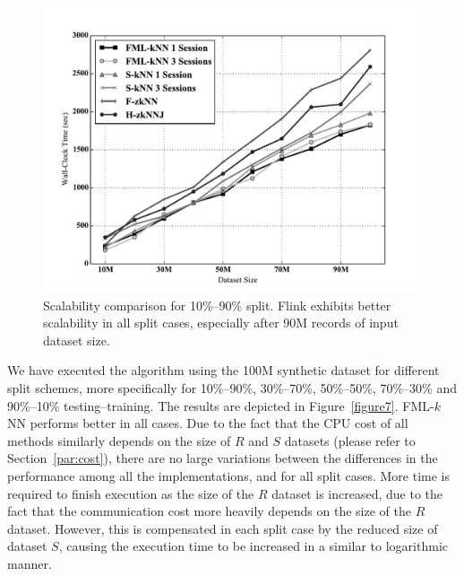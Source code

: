 \begin{figure}[h!]
	\centering
	\includegraphics[width=\textwidth]{figures/figure6.pdf}
	\caption{Scalability comparison for 10\%--90\% split. Flink exhibits better scalability in all split cases, especially after 90M records of input dataset size.}
	\label{figure6}
\end{figure}

We have executed the algorithm using the 100M synthetic dataset for different split schemes, more specifically for 10\%--90\%,  30\%--70\%, 50\%--50\%, 70\%--30\% and 90\%--10\% testing--training. The results are depicted in Figure~\ref{figure7}. FML-$k$NN performs better in all cases. Due to the fact that the CPU cost of all methods similarly depends on the size of $R$ and $S$ datasets (please refer to Section~\ref{par:cost}), there are no large variations between the differences in the performance among all the implementations, and for all split cases. More time is required to finish execution as the size of the $R$ dataset is increased, due to the fact that the communication cost more heavily depends on the size of the $R$ dataset. However, this is compensated in each split case by the reduced size of dataset $S$, causing the execution time to be increased in a similar to logarithmic manner.

